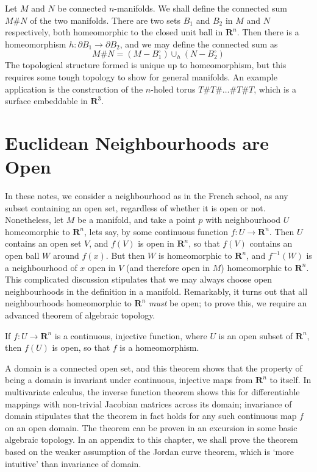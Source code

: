 \begin{example}
    Let $M$ and $N$ be connected $n$-manifolds. We shall define the connected sum $M \# N$ of the two manifolds. There are two sets $B_1$ and $B_2$ in $M$ and $N$ respectively, both homeomorphic to the closed unit ball in $\mathbf{R}^n$. Then there is a homeomorphism $h:\partial B_1 \to \partial B_2$, and we may define the connected sum as
    \[ M \# N = (M - B_1^\circ) \cup_h (N - B_2^\circ) \]
    The topological structure formed is unique up to homeomorphism, but this requires some tough topology to show for general manifolds. An example application is the construction of the $n$-holed torus $T \# T \# \dots \# T \# T$, which is a surface embeddable in $\mathbf{R}^3$.
\end{example}

\section{Euclidean Neighbourhoods are Open}

In these notes, we consider a neighbourhood as in the French school, as any subset containing an open set, regardless of whether it is open or not. Nonetheless, let $M$ be a manifold, and take a point $p$ with neighbourhood $U$ homeomorphic to $\mathbf{R}^n$, lets say, by some continuous function $f: U \to \mathbf{R}^n$. Then $U$ contains an open set $V$, and $f(V)$ is open in $\mathbf{R}^n$, so that $f(V)$ contains an open ball $W$ around $f(x)$. But then $W$ is homeomorphic to $\mathbf{R}^n$, and $f^{-1}(W)$ is a neighbourhood of $x$ open in $V$ (and therefore open in $M$) homeomorphic to $\mathbf{R}^n$. This complicated discussion stipulates that we may always choose open neighbourhoods in the definition in a manifold. Remarkably, it turns out that all neighbourhoods homeomorphic to $\mathbf{R}^n$ {\it must} be open; to prove this, we require an advanced theorem of algebraic topology.


\begin{theorem}
    If $f:U \to \mathbf{R}^n$ is a continuous, injective function, where $U$ is an open subset of $\mathbf{R}^n$, then $f(U)$ is open, so that $f$ is a homeomorphism.
\end{theorem}

A domain is a connected open set, and this theorem shows that the property of being a domain is invariant under continuous, injective maps from $\mathbf{R}^n$ to itself. In multivariate calculus, the inverse function theorem shows this for differentiable mappings with non-trivial Jacobian matrices across its domain; invariance of domain stipulates that the theorem in fact holds for any such continuous map $f$ on an open domain. The theorem can be proven in an excursion in some basic algebraic topology. In an appendix to this chapter, we shall prove the theorem based on the weaker assumption of the Jordan curve theorem, which is `more intuitive' than invariance of domain.

